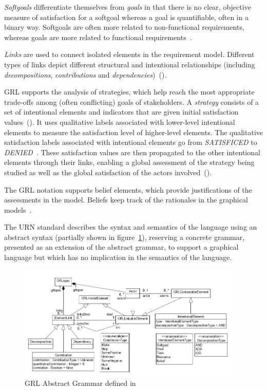 \documentclass[dissertation,final]{softeng}
\begin{document}
\emph{Softgoals} differentiate themselves from \emph{goals} in that there is no clear, objective measure of satisfaction for a softgoal whereas a goal is quantifiable, often in a binary way. Softgoals are often more related to non-functional requirements, whereas goals are more related to functional requirements~\citep{amyot2011user}.

\emph{Links} are used to connect isolated elements in the requirement model. Different types of links depict different structural and intentional relationships (including \emph{decompositions}, \emph{contributions} and \emph{dependencies})~().

GRL supports the analysis of strategies, which help reach the most appropriate trade-offs among (often conflicting) goals of stakeholders. A \emph{strategy} consists of a set of intentional elements and indicators that are given initial satisfaction values~(). It uses qualitative labels associated with lower-level intentional elements to measure the satisfaction level of higher-level elements. The qualitative satisfaction labels associated with intentional elements go from \emph{SATISFICED} to \emph{DENIED}~\citep{Roy:2007wyba}. These satisfaction values are then propagated to the other intentional elements through their links, enabling a global assessment of the strategy being studied as well as the global satisfaction of the actors involved~().

The GRL notation supports belief elements, which provide justifications of the assessments in the model. Beliefs keep track of the rationales in the graphical models~\citep{Roy:2007wyba}.

The URN standard describes the syntax and semantics of the language using an abstract syntax (partially shown in figure~\ref{fig:grl_abstract_grammar}), reserving a concrete grammar, presented as an extension of the abstract grammar, to support a graphical language but which has no implication in the semantics of the language.

\begin{figure}[h]
\includegraphics[width=0.95\textwidth]{grl_abstract_grammar}
\centering
\caption[GRL Abstract Grammar]{GRL Abstract Grammar defined in~}
\label{fig:grl_abstract_grammar}
\end{figure}
\end{document}

